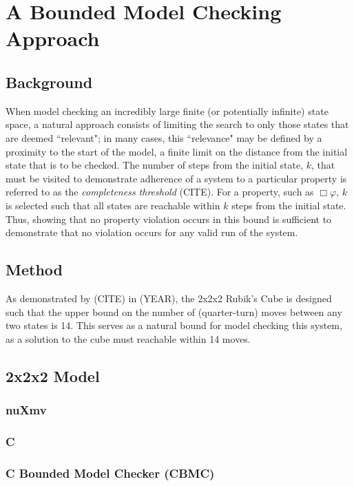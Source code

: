 \documentclass{article}
\renewcommand{\phi}{\varphi}
\newcommand{\always}{\Box}
\begin{document}
\newpage

\section{A Bounded Model Checking Approach}

\subsection{Background}
When model checking an incredibly large finite (or potentially infinite) state space, a natural approach consists of limiting the search to only those states that are deemed ``relevant"; in many cases, this ``relevance" may be defined by a proximity to the start of the model, a finite limit on the distance from the initial state that is to be checked. The number of steps from the initial state, $k$, that must be visited to demonstrate adherence of a system to a particular property is referred to as the \textit{completeness threshold} (CITE). For a property, such as $\always \phi$, $k$ is selected such that all states are reachable within $k$ steps from the initial state. Thus, showing that no property violation occurs in this bound is sufficient to demonstrate that no violation occurs for any valid run of the system.

\subsection {Method}
As demonstrated by (CITE) in (YEAR), the 2x2x2 Rubik's Cube is designed such that the upper bound on the number of (quarter-turn) moves between any two states is 14. This serves as a natural bound for model checking this system, as a solution to the cube must reachable within 14 moves.

\subsection {2x2x2 Model}

\subsubsection {nuXmv}

\subsubsection {C}

\subsubsection {C Bounded Model Checker (CBMC)}
\end{document}
